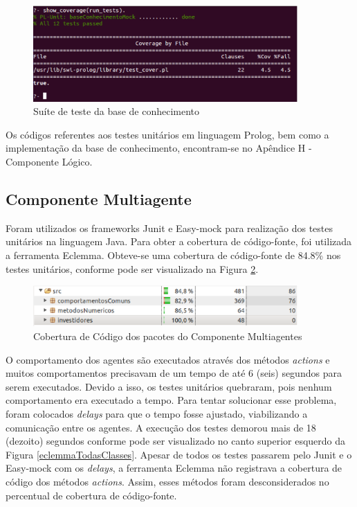 \begin{figure}[H]
\centering
\includegraphics[width=0.9\textwidth]{figuras/prologTeste2}
\caption{Suíte de teste da base de conhecimento}
\label{prologTeste2}
\end{figure}

Os códigos referentes aos testes unitários em linguagem Prolog, bem como a implementação da base de conhecimento, encontram-se no Apêndice H - Componente Lógico.

\subsection{Componente Multiagente}
Foram utilizados os frameworks Junit e Easy-mock para realização dos testes unitários na linguagem Java. Para obter a cobertura de código-fonte, foi utilizada a ferramenta Eclemma. Obteve-se uma cobertura de código-fonte de 84.8\% nos testes unitários, conforme pode ser visualizado na Figura \ref{eclemmaSMA}. 

\begin{figure}[H]
\centering
\includegraphics[width=0.9\textwidth]{figuras/eclemmaSMA}
\caption{Cobertura de Código dos pacotes do Componente Multiagentes}
\label{eclemmaSMA}
\end{figure}

O comportamento dos agentes são executados através dos métodos \textit{actions} e muitos  comportamentos precisavam de um tempo de até 6 (seis) segundos para serem executados. Devido a isso, os testes unitários quebraram, pois nenhum comportamento era executado a tempo. Para tentar solucionar esse problema, foram colocados \textit{delays} para que o tempo fosse ajustado, viabilizando a comunicação entre os agentes. A execução dos testes demorou mais de 18 (dezoito) segundos conforme pode ser visualizado no  canto superior esquerdo da Figura \ref{eclemmaTodasClasses}. Apesar de todos os testes passarem pelo Junit e o Easy-mock com os \textit{delays}, a ferramenta Eclemma não registrava a cobertura de código dos métodos \textit{actions}. Assim, esses métodos foram desconsiderados no percentual de cobertura de código-fonte.

